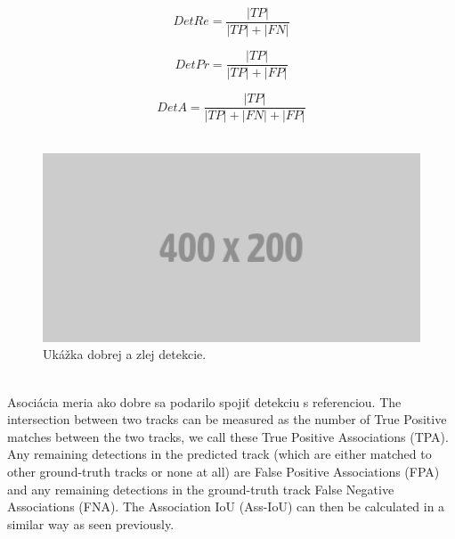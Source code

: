 \begingroup
\begin{equation}
DetRe = \frac{|TP|}{|TP| + |FN|}
\label{e:DetRe}
\end{equation}

\begin{equation}
DetPr = \frac{|TP|}{|TP| + |FP|}
\label{e:DetPr}
\end{equation}

\begin{equation}
DetA = \frac{|TP|}{|TP| + |FN| + |FP|}
\label{e:DetA}
\end{equation}
\endgroup
\\
\begin{figure}[ht]
    \centering
    \includegraphics[width=1\textwidth]{images/placeholder.png}
    \caption{Ukážka dobrej a zlej detekcie.}
    \label{img:det-img}
\end{figure}

%
%
%

%
%
%
%

\\
Asociácia meria ako dobre sa podarilo spojiť detekciu s referenciou.  The intersection between two tracks can be measured as the number of True Positive matches between the two tracks, we call these True Positive Associations (TPA). Any remaining detections in the predicted track (which are either matched to other ground-truth tracks or none at all) are False Positive Associations (FPA) and any remaining detections in the ground-truth track False Negative Associations (FNA). The Association IoU (Ass-IoU) can then be calculated in a similar way as seen previously.

